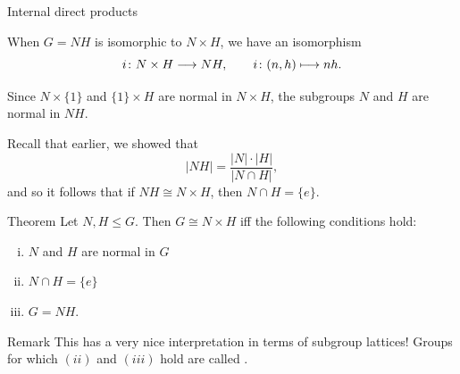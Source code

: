 \documentclass[8pt, handout]{beamer}
\newcommand{\Pause}{}      %
\begin{document}
\begin{frame}{Internal direct products}

  When $G=NH$ is isomorphic to $N\times H$, we have an isomorphism
  \[
  i\colon N\times H\longrightarrow NH,\qquad i\colon (n,h)\longmapsto nh.
  \]

  \Pause

  Since $N\times\{1\}$ and $\{1\}\times H$ are normal in $N\times H$,
  the subgroups $N$ and $H$ are normal in $NH$. \medskip\Pause
  
  Recall that earlier, we showed that \vspace{-1mm}
  \[
  \displaystyle|NH|=\frac{|N|\cdot|H|}{|N\cap H|},
  \]
  and so it follows that if $NH\cong N\times H$, then $N\cap H=\{e\}$.
  
  \smallskip\Pause
  
  \begin{block}{Theorem}
    Let $N,H\leq G$. Then $G\cong N\times H$ iff the following
    conditions hold:
    \begin{enumerate}[(i)]
    \item $N$ and $H$ are normal in $G$
    \item $N\cap H=\{e\}$
    \item $G=NH$.
    \end{enumerate}
  \end{block}
  
  \Pause
  
  \begin{exampleblock}{Remark}
    This has a very nice interpretation in terms of subgroup lattices!
    \Pause Groups for which $(ii)$ and $(iii)$ hold are called
    .
  \end{exampleblock}
  
\end{frame}

\end{document}
